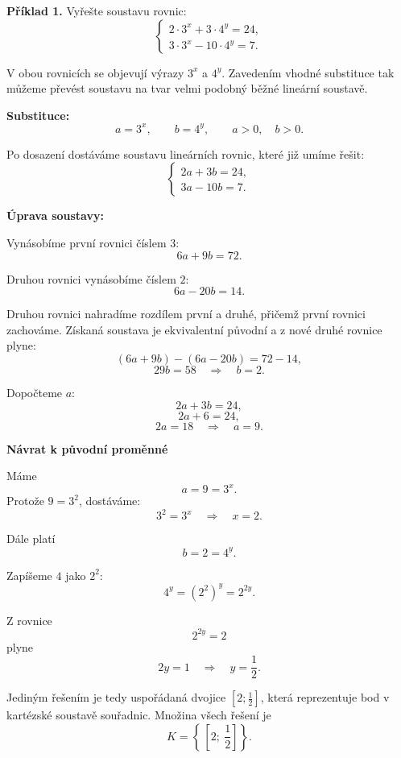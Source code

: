 \documentclass[12pt,a4paper]{article}
\begin{document}
\begin{examplebox}
\textbf{Příklad 1.}  
Vyřešte soustavu rovnic:
\[
\begin{cases}
2 \cdot 3^x + 3 \cdot 4^y = 24, \\
3 \cdot 3^x - 10 \cdot 4^y = 7.
\end{cases}
\]

V obou rovnicích se objevují výrazy $3^x$ a $4^y$. Zavedením vhodné substituce tak 
můžeme převést soustavu na tvar velmi podobný běžné lineární soustavě.

\medskip
\textbf{Substituce:}  
\[
a = 3^x, \qquad b = 4^y,\qquad a>0,\quad b>0.
\]

Po dosazení dostáváme soustavu lineárních rovnic, které již umíme řešit:
\[
\begin{cases}
2a + 3b = 24, \\
3a - 10b = 7.
\end{cases}
\]

\textbf{Úprava soustavy:}

Vynásobíme první rovnici číslem $3$:
\[
6a + 9b = 72.
\]

Druhou rovnici vynásobíme číslem $2$:
\[
6a - 20b = 14.
\]

Druhou rovnici nahradíme rozdílem první a druhé, přičemž první rovnici zachováme.
Získaná soustava je ekvivalentní původní a z nové druhé rovnice plyne:
\[
(6a + 9b) - (6a - 20b) = 72 - 14,
\]
\[
29b = 58 \quad \Longrightarrow \quad b = 2.
\]

Dopočteme $a$:
\[
2a + 3b = 24,
\]
\[
2a + 6 = 24,
\]
\[
2a = 18 \quad \Longrightarrow \quad a = 9.
\]

\medskip
\textbf{Návrat k původní proměnné}

Máme
\[
a = 9 = 3^x.
\]
Protože $9 = 3^2$, dostáváme:
\[
3^2 = 3^x \quad\Longrightarrow\quad x = 2.
\]

Dále platí
\[
b = 2 = 4^y.
\]

Zapíšeme $4$ jako $2^2$:
\[
4^y = (2^2)^y = 2^{2y}.
\]

Z rovnice
\[
2^{2y} = 2
\]
plyne
\[
2y = 1 \quad\Longrightarrow\quad y = \frac{1}{2}.
\]

\medskip
Jediným řešením je tedy uspořádaná dvojice $[2;\frac12]$, která reprezentuje bod v kartézské soustavě souřadnic.
Množina všech řešení je
\[
K = \left\{\, \left[2;\ \frac{1}{2}\right] \right\}.
\]

\end{examplebox}
\end{document}
